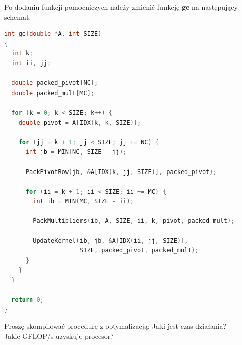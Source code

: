 \documentclass[12pt,a4paper]{article}
\begin{document}
Po dodaniu funkcji pomocniczych należy zmienić funkcję \textbf{ge} na
następujący schemat:

\begin{lstlisting}[language=C, frame=none, basicstyle=\small]
int ge(double *A, int SIZE)
{
  int k;
  int ii, jj;

  double packed_pivot[NC];
  double packed_mult[MC];

  for (k = 0; k < SIZE; k++) {
    double pivot = A[IDX(k, k, SIZE)];

    for (jj = k + 1; jj < SIZE; jj += NC) {
      int jb = MIN(NC, SIZE - jj);

      PackPivotRow(jb, &A[IDX(k, jj, SIZE)], packed_pivot);

      for (ii = k + 1; ii < SIZE; ii += MC) {
        int ib = MIN(MC, SIZE - ii);

        PackMultipliers(ib, A, SIZE, ii, k, pivot, packed_mult);

        UpdateKernel(ib, jb, &A[IDX(ii, jj, SIZE)],
                     SIZE, packed_pivot, packed_mult);
      }
    }
  }

  return 0;
}
\end{lstlisting}



Proszę skompilować procedurę z optymalizacją:
Jaki jest czas działania?\\
Jakie GFLOP/s uzyskuje procesor?





\subsection{}
\end{document}
